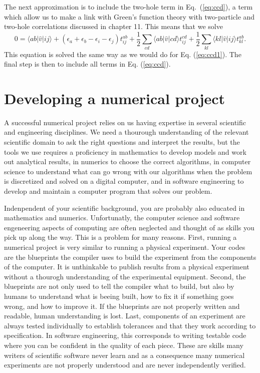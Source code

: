   \noindent
  The next approximation is to include the two-hole term in
  Eq.~(\ref{eq:ccd}), a term which allow us to make a link with
  Green's function theory with two-particle and two-hole
  correlations discussed in chapter 11. This means that we solve
  \begin{equation}
  0 = \langle ab \vert \hat{v} \vert ij \rangle +
  \left(\epsilon_a+\epsilon_b-\epsilon_i-\epsilon_j\right)t_{ij}^{ab}+\frac{1}{2}\sum_{cd}
  \langle ab \vert \hat{v} \vert cd \rangle
  t_{ij}^{cd}+\frac{1}{2}\sum_{kl} \langle kl \vert \hat{v} \vert ij
  \rangle t_{kl}^{ab}.
  \label{eq:ccd2}
  \end{equation}
  This equation is solved the same way as we would do for
  Eq. (\ref{eq:ccd1}). The final step is then to include all terms in
  Eq. (\ref{eq:ccd}).

\section{Developing a numerical project}\label{sec:chap8numproject}
A successful numerical project relies on us having expertise in several scientific and
engineering disciplines. We need a thourough understanding of the relevant scientific
domain to ask the right questions and interpret the results, but the tools we
use requires a proficiency in mathematics to develop models and work out
analytical results, in numerics to choose the correct algorithms, in computer
science to understand what can go wrong with our algorithms when the problem is
discretized and solved on a digital computer, and in software engineering to
develop and maintain a computer program that solves our problem.

Indenpendent of your scientific background, you are probably also educated in
mathematics and numerics. Unfortunatly, the computer science and
software engeneering aspects of computing are often neglected and thought of as
skills you pick up along the way. This is a problem for many reasons. First,
running a numerical project is very similar to running a
physical experiment. Your codes are the blueprints the compiler uses to build
the experiment from the components of the computer. It is unthinkable to publish
results from a physical experiment without a thourogh understanding of the
experimental
equipment. Second, the blueprints are not only used to tell the compiler what to
build, but also by humans to understand what is beeing built, how to fix
it if something goes wrong, and how to improve it. If the blueprints are not
properly written and readable, human understanding is lost. Last, components of an experiment
are always tested individually to establish tolerances and that they work
according to specification. In software engineering, this corresponds to writing
testable code where you can be confident in the quality of each piece. These are
skills many writers of scientific software never learn and as a consequence
many numerical experiments are not properly understood and are never independently
verified.

